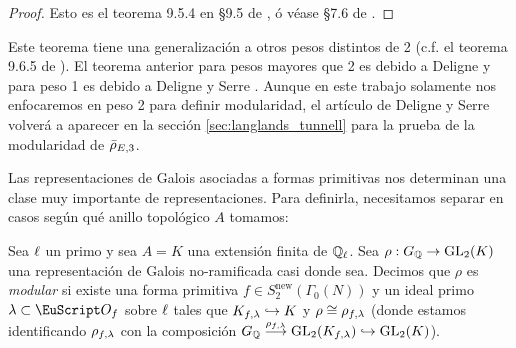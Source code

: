 \documentclass[../../tesis_maestria]{subfiles}
\begin{document}

\begin{proof}
  Esto es el teorema 9.5.4 en \S 9.5 de \cite{DiamondShurmanAFCIMF}, \'o v\'ease \S 7.6 de \cite{ShimuraITTATOAF}.
\end{proof}

Este teorema tiene una generalizaci\'on a otros pesos distintos de 2 (c.f. el teorema 9.6.5 de \cite{DiamondShurmanAFCIMF}). El teorema anterior para pesos mayores que 2 es debido a Deligne \cite{DeligneFMERLA} y para peso 1 es debido a Deligne y Serre \cite{DeligneSerreFMDP1}. Aunque en este trabajo solamente nos enfocaremos en peso 2 para definir modularidad, el art\'iculo de Deligne y Serre volver\'a a aparecer en la secci\'on \ref{sec:langlands_tunnell} para la prueba de la modularidad de $\bar{\rho}_{E,3}$.

Las representaciones de Galois asociadas a formas primitivas nos determinan una clase muy importante de representaciones. Para definirla, necesitamos separar en casos seg\'un qu\'e anillo topol\'ogico $A$ tomamos:

\begin{defin}\label{def:modularidad_rho_ext_finita}
  Sea $\ell$ un primo y sea $A=K$ una extensi\'on finita de $\mathbb{Q}_{\ell}$. Sea $\rho:G_{\mathbb{Q}}\rightarrow\mathrm{GL}_2(K)$ una representaci\'on de Galois no-ramificada casi donde sea. Decimos que $\rho$ es \emph{modular} si existe una forma primitiva $f\in S_2^{\mathrm{new}}(\Gamma_0(N))$ y un ideal primo $\la\subset\Oo_{f}$ sobre $\ell$ tales que $K_{f,\lambda}\hookrightarrow K$ y $\rho\cong\rho_{f,\lambda}$ (donde estamos identificando $\rho_{f,\lambda}$ con la composici\'on $G_{\mathbb{Q}}\overset{\rho_{f,\lambda}}{\longrightarrow}\mathrm{GL}_2(K_{f,\lambda})\hookrightarrow\mathrm{GL}_2(K)$).
\end{defin}
\end{document}
